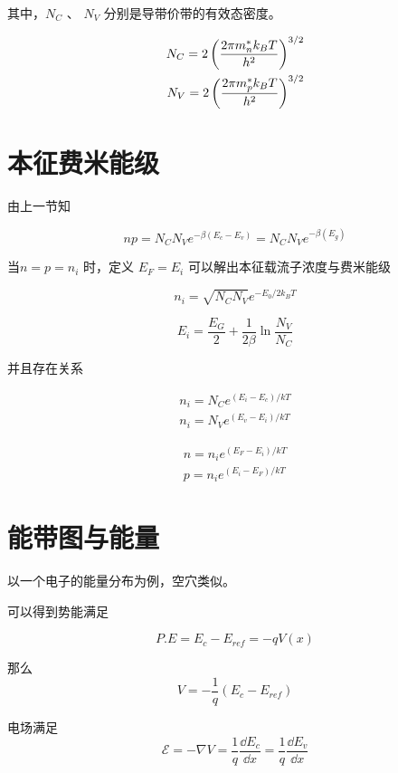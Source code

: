 \documentclass[cn,11pt,chinese,black,simple]{../elegantbook}
\begin{document}
其中，\(N_C\) 、 \(N_V\) 分别是导带价带的有效态密度。

\begin{equation*}
    \begin{aligned}
        N_C = 2 \left(\displaystyle\frac{2 \pi m_n^* k_B T}{h^2}\right) ^{3/2} \\
        N_V = 2 \left(\displaystyle\frac{2 \pi m_p^* k_B T}{h^2}\right) ^{3/2} 
    \end{aligned}
\end{equation*}

\section{本征费米能级}

由上一节知

\[n p = N_C N_V e^{-\beta(E_c - E_v)} =N_C N_V e^{-\beta(E_g)} \]

当\(n = p = n_i\) 时，定义 \(E_F = E_i\) 
可以解出本征载流子浓度与费米能级

\[n_i = \sqrt{N_C N_V} e^{-E_0/2k_B T}\]

\[E_i = \dfrac{E_G}{2} + \dfrac{1}{2 \beta} \ln \dfrac{N_V}{N_C}\]

并且存在关系

\[\begin{array}{l}
    n_{ i }=N_{ C } e^{\left(E_{ i }-E_{ c }\right) / k T} \\
    n_{ i }=N_{ V } e^{\left(E_{ v }-E_{ i }\right) / k T}
\end{array}\]

\[\begin{array}{l} 
    n = n _{ i } e^{\left(E_{ F }-E_{ i }\right) / k T} \\
    p = n _{ i } e^{\left(E_{ i }- E _{ F }\right) / k T}
\end{array}\]

\section{能带图与能量}

以一个电子的能量分布为例，空穴类似。



可以得到势能满足 

\[P.E = E_c - E_{ref} = -q V(x)\] 

那么 \[V = - \dfrac{1}{q}(E_c - E_{ref})\]

电场满足 \[\mathscr{E} = -\nabla V = \dfrac{1}{q}\dfrac{\dd{E_c}}{\dd{x}}   = \dfrac{1}{q}\dfrac{\dd{E_v}}{\dd{x}}\]


\ifx\mainclass\undefined
\end{document}
